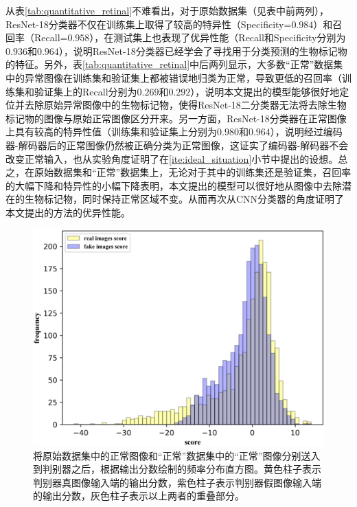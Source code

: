 \noindent 从表\ref{tab:quantitative_retinal}不难看出，对于原始数据集（见表中前两列），ResNet-18分类器不仅在训练集上取得了较高的特异性（Specificity=$0.984$）和召回率（Recall=$0.958$），在测试集上也表现了优异性能（Recall和Specificity分别为$0.936$和$0.964$），说明ResNet-18分类器已经学会了寻找用于分类预测的生物标记物的特征。另外，表\ref{tab:quantitative_retinal}中后两列显示，大多数“正常”数据集中的异常图像在训练集和验证集上都被错误地归类为正常，导致更低的召回率（训练集和验证集上的Recall分别为$0.269$和$0.292$），说明本文提出的模型能够很好地定位并去除原始异常图像中的生物标记物，使得ResNet-18二分类器无法将去除生物标记物的图像与原始正常图像区分开来。另一方面，ResNet-18分类器在正常图像上具有较高的特异性值（训练集和验证集上分别为$0.980$和$0.964$），说明经过编码器-解码器后的正常图像仍然被正确分类为正常图像，这证实了编码器-解码器不会改变正常输入，也从实验角度证明了在\ref{ite:ideal_situation}小节中提出的设想。总之，在原始数据集和“正常”数据集上，无论对于其中的训练集还是验证集，召回率的大幅下降和特异性的小幅下降表明，本文提出的模型可以很好地从图像中去除潜在的生物标记物，同时保持正常区域不变。从而再次从CNN分类器的角度证明了本文提出的方法的优异性能。
\begin{figure}[h]
	\centering
	\includegraphics[width=1.0\textwidth]{figure/score_distribution.png}
	\caption{将原始数据集中的正常图像和“正常”数据集中的“正常”图像分别送入到判别器之后，根据输出分数绘制的频率分布直方图。黄色柱子表示判别器真图像输入端的输出分数，紫色柱子表示判别器假图像输入端的输出分数，灰色柱子表示以上两者的重叠部分。}
	\label{fig:hist_freq}
\end{figure}

